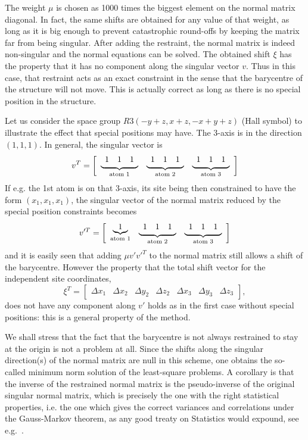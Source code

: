 \documentclass[12pt]{article}
\begin{document}
The weight $\mu$ is chosen as 1000 times the biggest element on the normal matrix diagonal. In fact, the same shifts are obtained for any value of that weight, as long as it is big enough to prevent catastrophic round-offs by keeping the matrix far from being singular. After adding the restraint, the normal matrix is indeed non-singular and the normal equations can be solved. The obtained shift $\xi$ has the property that it has no component along the singular vector $v$. Thus in this case, that restraint acts as an exact constraint in the sense that the barycentre of the structure will not move. This is actually correct as long as there is no special position in the structure. 

Let us consider the space group $R 3 (-y+z, x+z, -x+y+z)$ (Hall symbol) to illustrate the effect that special positions may have. The 3-axis is in the direction $(1, 1, 1)$.  In general, the singular vector is
\renewcommand{\tmp}[1]{\underbrace{\protect\begin{array}{ccc} 1&1&1 \end{array}}_{\text{atom #1}}}
\begin{equation}
v^T = \left[ \begin{array}{ccc} \tmp{1} & \tmp{2} & \tmp{3} \end{array} \right]
\end{equation}
If e.g. the 1st atom is on that 3-axis, its site being then constrained to have the form $(x_1, x_1, x_1)$, the singular vector of the normal matrix reduced by the special position constraints becomes
\begin{equation}
v'^T = \left[ \begin{array}{ccc} \underbrace{1}_{\text{atom 1}} & \tmp{2} & \tmp{3} \end{array} \right]
\end{equation}
and it is easily seen that adding $\mu v' v'^T$ to the normal matrix still allows a shift of the barycentre. However the property that the total shift vector for the independent site coordinates,
\begin{equation}
\xi^T = \begin{bmatrix} \Delta x_1 & \Delta x_2 & \Delta y_2 & \Delta z_2 & \Delta x_3 & \Delta y_3 & \Delta z_3 \end{bmatrix},
\end{equation}
does not have any component along $v'$ holds as in the first case without special positions: this is a general property of the method.

We shall stress that the fact that the barycentre is not always restrained to stay at the origin is not a problem at all. Since the shifts along the singular direction(s) of the normal matrix are null in this scheme, one obtains the so-called minimum norm solution of the least-square problems. A corollary is that the inverse of the restrained normal matrix is the pseudo-inverse of the original singular normal matrix, which is precisely the one with the right statistical properties, i.e. the one which gives the correct variances and correlations under the Gauss-Markov theorem, as any good treaty on Statistics would expound, see e.g.~\cite{Silvey:1975}.
\end{document}
